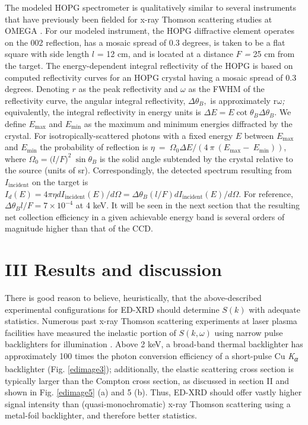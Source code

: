 The modeled HOPG spectrometer is qualitatively similar to several
instruments that have previously been fielded for x-ray Thomson
scattering studies at OMEGA
 \cite{yoo2012graphene, visco2012measurement}.
For our modeled instrument, the HOPG diffractive element operates on the
002 reflection, has a mosaic spread of 0.3 degrees, is taken to be a
flat square with side length \(l\) = 12 cm, and is located at a distance
\(F\) \emph{=} 25 cm from the target. The energy-dependent integral
reflectivity of the HOPG is based on computed reflectivity curves
 \cite{freund1996x}
for an HOPG crystal having a mosaic spread of 0.3 degrees. Denoting
\(r\) as the peak reflectivity and \(\omega\) as the FWHM of the
reflectivity curve, the angular integral reflectivity,
\(\Delta\theta_{B},\) is approximately \(\text{rω}\)\emph{;}
equivalently, the integral reflectivity in energy units is
\(\Delta E = E\cot{\theta_{B}\Delta\theta_{B}}\). We define \(E_{\max}\)
and \(E_{\min}\) as the maximum and minimum energies diffracted by the
crystal. For isotropically-scattered photons with a fixed energy \(E\)
between \(E_{\max}\) and \(E_{\min}\) the probability of reflection is
\(\eta\  = \ \Omega_{0}\Delta E/(4\ \pi\ \left( E_{\max} - \ E_{\min} \right))\),
where \(\Omega_{0} = ({l/F)}^{2}\ \sin\theta_{B}\) is the solid angle
subtended by the crystal relative to the source (units of sr).
Correspondingly, the detected spectrum resulting from
\(I_{\text{incident}}\) on the target is
\(I_{d}\left( E \right) = 4\pi\eta dI_{\text{incident}}\left( E \right)/d\Omega = \Delta\theta_{B}(l/F)dI_{\text{incident}}\left( E \right)/d\Omega\).
For reference, \(\Delta\theta_{B}l/F = 7 \times 10^{- 4}\) at 4 keV. It
will be seen in the next section that the resulting net collection
efficiency in a given achievable energy band is several orders of
magnitude higher than that of the CCD.

\section{III Results and
discussion}\label{iii-results-and-discussion}

There is good reason to believe, heuristically, that the above-described
experimental configurations for ED-XRD should determine
\(S\left( k \right)\) with adequate statistics. Numerous past x-ray
Thomson scattering experiments at laser plasma facilities have measured
the inelastic portion of \(S\left( k,\omega \right)\) using narrow pulse
backlighters for illumination
 \cite{glenzer2009x, lee2009x, fortmann2012measurement, tommasini2010development, kritcher2008ultrafast, glenzer2003demonstration, gregori2006measurement}.
Above 2 keV, a broad-band thermal backlighter has approximately 100
times the photon conversion efficiency of a short-pulse Cu
\emph{K\textsubscript{α}} backlighter (Fig. \ref{edimage3}); additionally, the
elastic scattering cross section is typically larger than the Compton
cross section, as discussed in section II and shown in Fig. \ref{edimage5} (a) and 5
(b). Thus, ED-XRD should offer vastly higher signal intensity than
(quasi-monochromatic) x-ray Thomson scattering using a metal-foil
backlighter, and therefore better statistics.


